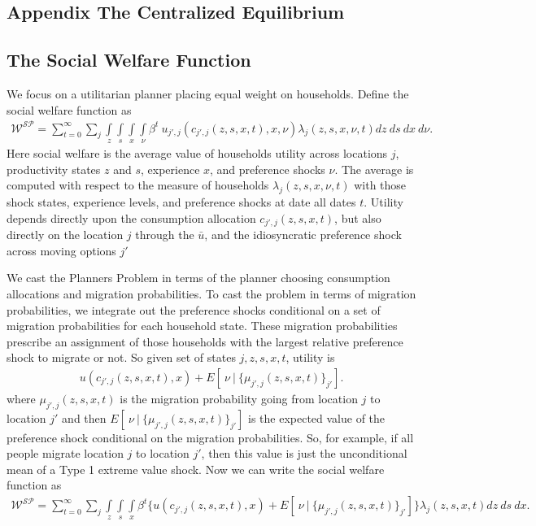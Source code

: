 \documentclass[12pt,pdftex]{article}
\begin{document}
\begin{onehalfspacing}
\section{Appendix The Centralized Equilibrium}

\subsection{The Social Welfare Function}

We focus on a utilitarian planner placing equal weight on households. Define the social welfare function as
\begin{align}
\mathcal{W^{SP}} = \sum_{t=0}^{\infty}\sum_{j} \int\limits_{z} \int\limits_{s} \int\limits_{x} \int\limits_{\nu} \beta^{t} \ u_{j',j}(c_{j',j}(z, s, x, t), x, \nu) \lambda_{j}(z, s, x, \nu, t) dz \ ds \ dx \ d\nu.
\label{eq:sp-social_welfare}
\end{align}
Here social welfare is the average value of households utility across locations $j$, productivity states $z$ and $s$, experience $x$, and preference shocks $\nu$. The average is computed with respect to the measure of households $\lambda_{j}(z, s, x, \nu, t)$ with those shock states, experience levels, and preference shocks at date all dates $t$. Utility depends directly upon the consumption allocation $c_{j',j}(z, s, x, t)$, but also  directly on the location $j$ through the $\bar u$, and the idiosyncratic preference shock across moving options $j'$

We cast the Planners Problem in terms of the planner choosing consumption allocations and migration probabilities. To cast the problem in terms of migration probabilities, we integrate out the preference shocks conditional on a set of migration probabilities for each household state. These migration probabilities prescribe an assignment of those households with the largest relative preference shock to migrate or not. So given set of states $j, z, s, x, t$, utility is
\begin{align}
u(c_{j',j}(z,s, x, t), x) + E[ \ \nu \ | \ \big\{\mu_{j',j}(z,s,x,t)\big\}_{j'} ].
\label{eq:utility-shocks}
\end{align}
where $\mu_{j',j}(z,s,x,t)$ is the migration probability going from location $j$ to location $j'$ and then $E[ \ \nu \ | \ \big\{\mu_{j',j}(z,s,x,t)\big\}_{j'} ]$ is the expected value of the preference shock conditional on the migration probabilities. So, for example, if all people migrate location $j$ to location $j'$, then this value is just the unconditional mean of a Type 1 extreme value shock. Now we can write the social welfare function as
\begin{align}
\mathcal{W^{SP}} = \sum_{t=0}^{\infty}\sum_{j} \int\limits_{z} \int\limits_{s} \int\limits_{x} \beta^{t} \bigg \{ u(c_{j',j}(z, s, x, t), x) + E[ \ \nu \ | \ \big\{\mu_{j',j}(z, s,x,t)\big\}_{j'}] \bigg \} \lambda_{j}(z, s, x, t) dz \ ds \ dx.
\label{eq:sp-social_welfare2}
\end{align}


\end{onehalfspacing}
\end{document}
